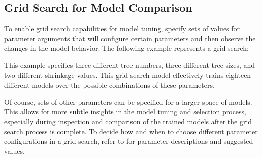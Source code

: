 \subsection{Grid Search for Model Comparison}
\label{ssec:Grid search}

To enable grid search capabilities for model tuning, specify sets of values for parameter arguments that will configure certain parameters and then observe the changes in the model behavior. The following example represents a grid search:

\waterExampleInR



This example specifies three different tree numbers, three different tree sizes, and two different shrinkage values. This grid search model effectively trains eighteen different models over the possible combinations of these parameters.

Of course, sets of other parameters can be specified for a larger space of models. This allows for more subtle insights in the model tuning and selection process, especially during inspection and comparison of the trained models after the grid search process is complete. To decide how and when to choose different parameter configurations in a grid search, refer to {\textbf{}} for parameter descriptions and suggested values.

\begin{minipage}{\textwidth}
\waterExampleInR
 
\end{minipage}



